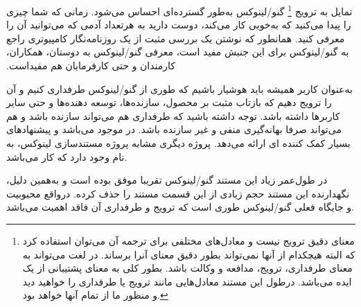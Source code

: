 تمایل به ترویج 
\footnote{
معنای دقیق  ترویج نیست و
معادل‌های مختلفی برای ترجمه آن می‌توان استفاده کرد که البته
هیچکدام از آنها نمی‌تواند بطور دقیق معنای آنرا برساند. 
در لغت می‌تواند به معنای طرفداری، ترویج، مدافعه و وکالت باشد.
بطور کلی  به معنای پشتیبانی از یک ایده می‌باشد.
درطول این مستند معادل‌هایی مانند ترویج یا طرفداری را خواهید دید
و منظور ما از تمام آنها  خواهد بود.
}
گنو/لینوکس به‌طور گسترده‌ای احساس می‌شود.
زمانی که شما چیزی را پیدا می‌کنید که ‫به‌خوبی کار می‌کند،
دوست دارید به هرتعداد آدمی که می‌توانید آن را معرفی کنید.
همانطور که نوشتن یک بررسی مثبت از یک روزنامه‌نگار کامپیوتری
راجع به گنو/لینوکس برای این جنبش مفید است، معرفی گنو/لینوکس
به دوستان، همکاران، کارمندان و حتی کارفرمایان هم مفیداست.

به‌عنوان کاربر همیشه باید هوشیار باشیم که طوری از گنو/لینوکس
طرفداری کنیم و آن را ترویج دهیم که بازتاب مثبت بر محصول،
سازنده‌ها، توسعه دهنده‌ها و حتی سایر کاربرها داشته باشد.
توجه داشته باشید که طرفداری هم می‌تواند سازنده باشد و هم می‌تواند
صرفا بهانه‌گیری منفی و غیر سازنده باشد.
در
موجود می‌باشد و پیشنهادهای بسیار کمک کننده ای ارائه می‌دهد.
پروژه دیگری مشابه پروژه مستندسازی لینوکس، به نام 
وجود دارد که کار  می‌باشد.



در طول‌عمر زیاد این مستند گنو/لینوکس تقریبا موفق بوده است و به‌همین دلیل،
نگهدارنده این مستند حجم زیادی از این قسمت مستند را حذف کرده. درواقع
محبوبیت و جایگاه فعلی گنو/لینوکس طوری است که ترویج و طرفداری آن فاقد اهمیت می‌باشد.

